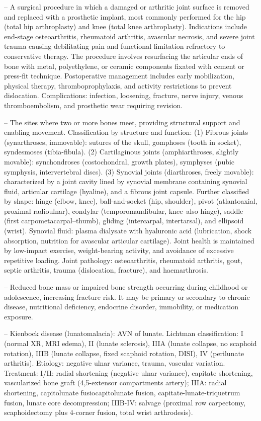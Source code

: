 -- A surgical procedure in which a damaged or arthritic joint surface is removed and replaced with a prosthetic implant, most commonly performed for the hip (total hip arthroplasty) and knee (total knee arthroplasty). Indications include end-stage osteoarthritis, rheumatoid arthritis, avascular necrosis, and severe joint trauma causing debilitating pain and functional limitation refractory to conservative therapy. The procedure involves resurfacing the articular ends of bone with metal, polyethylene, or ceramic components fixated with cement or press-fit technique. Postoperative management includes early mobilization, physical therapy, thromboprophylaxis, and activity restrictions to prevent dislocation. Complications: infection, loosening, fracture, nerve injury, venous thromboembolism, and prosthetic wear requiring revision.

-- The sites where two or more bones meet, providing structural support and enabling movement. Classification by structure and function: (1) Fibrous joints (synarthroses, immovable): sutures of the skull, gomphoses (tooth in socket), syndesmoses (tibia-fibula). (2) Cartilaginous joints (amphiarthroses, slightly movable): synchondroses (costochondral, growth plates), symphyses (pubic symphysis, intervertebral discs). (3) Synovial joints (diarthroses, freely movable): characterized by a joint cavity lined by synovial membrane containing synovial fluid, articular cartilage (hyaline), and a fibrous joint capsule. Further classified by shape: hinge (elbow, knee), ball-and-socket (hip, shoulder), pivot (atlantoaxial, proximal radioulnar), condylar (temporomandibular, knee--also hinge), saddle (first carpometacarpal--thumb), gliding (intercarpal, intertarsal), and ellipsoid (wrist). Synovial fluid: plasma dialysate with hyaluronic acid (lubrication, shock absorption, nutrition for avascular articular cartilage). Joint health is maintained by low-impact exercise, weight-bearing activity, and avoidance of excessive repetitive loading. Joint pathology: osteoarthritis, rheumatoid arthritis, gout, septic arthritis, trauma (dislocation, fracture), and haemarthrosis.

-- Reduced bone mass or impaired bone strength occurring during childhood or adolescence, increasing fracture risk. It may be primary or secondary to chronic disease, nutritional deficiency, endocrine disorder, immobility, or medication exposure.

-- Kienbock disease (lunatomalacia): AVN of lunate. Lichtman classification: I (normal XR, MRI edema), II (lunate sclerosis), IIIA (lunate collapse, no scaphoid rotation), IIIB (lunate collapse, fixed scaphoid rotation, DISI), IV (perilunate arthritis). Etiology: negative ulnar variance, trauma, vascular variation. Treatment: I/II: radial shortening (negative ulnar variance), capitate shortening, vascularized bone graft (4,5-extensor compartments artery); IIIA: radial shortening, capitolunate fusiocapitolunate fusion, capitate-lunate-triquetrum fusion, lunate core decompression; IIIB-IV: salvage (proximal row carpectomy, scaphoidectomy plus 4-corner fusion, total wrist arthrodesis).

